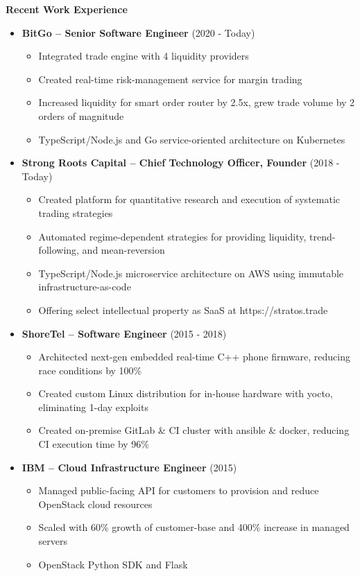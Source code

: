 \documentclass{report}
\begin{document}
\textbf{Recent Work Experience}
\begin{itemize}[label=$\cdot$]

\item \textbf{BitGo -- Senior Software Engineer} (2020 - Today)
  \begin{itemize}[label=$\circ$]
  \item Integrated trade engine with 4 liquidity providers
  \item Created real-time risk-management service for margin trading
  \item Increased liquidity for smart order router by 2.5x, grew trade volume by 2 orders of magnitude
  \item TypeScript/Node.js and Go service-oriented architecture on Kubernetes
  \end{itemize}

\item \textbf{Strong Roots Capital -- Chief Technology Officer, Founder} (2018 - Today)
  \begin{itemize}[label=$\circ$]
  \item Created platform for quantitative research and execution of systematic trading strategies
  \item Automated regime-dependent strategies for providing liquidity, trend-following, and mean-reversion
  \item TypeScript/Node.js microservice architecture on AWS using immutable infrastructure-as-code
  \item Offering select intellectual property as SaaS at https://stratos.trade
  \end{itemize}

\item \textbf{ShoreTel -- Software Engineer} (2015 - 2018)
  \begin{itemize}[label=$\circ$]
  \item Architected next-gen embedded real-time C++ phone firmware, reducing race conditions by 100\%
  \item Created custom Linux distribution for in-house hardware with yocto, eliminating 1-day exploits
  \item Created on-premise GitLab \& CI cluster with ansible \& docker, reducing CI execution time by 96\%
  \end{itemize}

\item \textbf{IBM -- Cloud Infrastructure Engineer} (2015)
  \begin{itemize}[label=$\circ$]
  \item Managed public-facing API for customers to provision and reduce OpenStack cloud resources
  \item Scaled with 60\% growth of customer-base and 400\% increase in managed servers
  \item OpenStack Python SDK and Flask
  \end{itemize}


\end{itemize}
\end{document}
